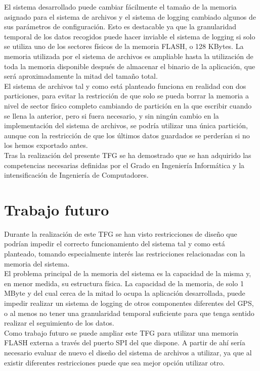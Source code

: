 El sistema desarrollado puede cambiar fácilmente el tamaño de la memoria asignado para el sistema de archivos y el sistema de logging cambiado algunos de sus parámetros de configuración. Esto es destacable ya que la granularidad temporal de los datos recogidos puede hacer inviable el sistema de logging si solo se utiliza uno de los sectores físicos de la memoria FLASH, o 128 KBytes. La memoria utilizada por el sistema de archivos es ampliable hasta la utilización de toda la memoria disponible después de almacenar el binario de la aplicación, que será aproximadamente la mitad del tamaño total. \\

El sistema de archivos tal y como está planteado funciona en realidad con dos particiones, para evitar la restricción de que solo se pueda borrar la memoria a nivel de sector físico completo cambiando de partición en la que escribir cuando se llena la anterior, pero si fuera necesario, y sin ningún cambio en la implementación del sistema de archivos, se podría utilizar una única partición, aunque con la restricción de que los últimos datos guardados se perderían si no los hemos exportado antes.\\

Tras la realización del presente \acs{TFG} se ha demostrado que se han adquirido las competencias necesarias definidas por el Grado en Ingeniería Informática y la intensificación de Ingeniería de Computadores.\\



\chapter{Trabajo futuro}
\label{chap:trabajoFuturo}

Durante la realización de este \acs{TFG} se han visto restricciones de diseño que podrían impedir el correcto funcionamiento del sistema tal y como está planteado, tomando especialmente interés las restricciones relacionadas con la memoria del sistema.\\

El problema principal de la memoria del sistema es la capacidad de la misma y, en menor medida, su estructura física. La capacidad de la memoria, de solo 1 MByte y del cual cerca de la mitad lo ocupa la aplicación desarrollada, puede impedir realizar un sistema de logging de otros componentes diferentes del GPS, o al menos no tener una granularidad temporal suficiente para que tenga sentido realizar el seguimiento de los datos.\\

Como trabajo futuro se puede ampliar este \acs{TFG} para utilizar una memoria FLASH externa a través del puerto SPI del que dispone. A partir de ahí sería necesario evaluar de nuevo el diseño del sistema de archivos a utilizar, ya que al existir diferentes restricciones puede que sea mejor opción utilizar otro.\\
